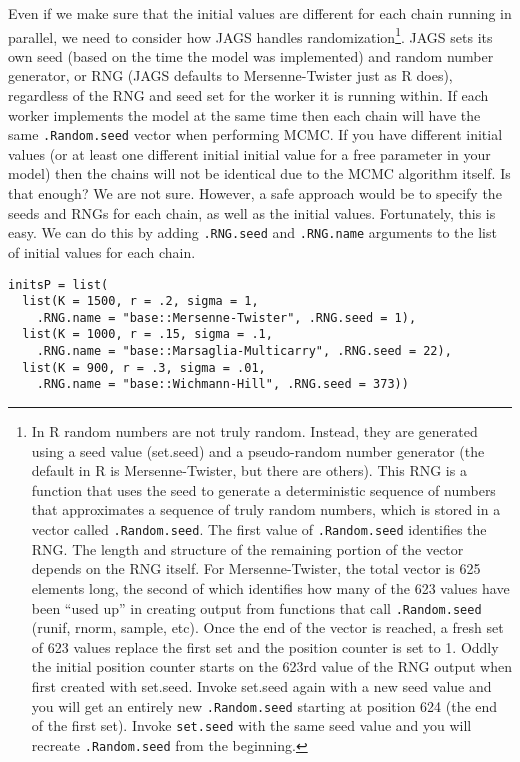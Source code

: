 \documentclass[12pt,english]{article}
\newcommand{\q}[1]{``#1''} %
\begin{document}
\noindent Even if we make sure that the initial values are different for each chain running in parallel, we need to consider how JAGS handles randomization\footnote{In R random numbers are not truly random. Instead, they are generated using a seed value (set.seed) and a pseudo-random number generator (the default in R is Mersenne-Twister, but there are others). This RNG is a function that uses the seed to generate a deterministic sequence of numbers that approximates a sequence of truly random numbers, which is stored in a vector called \texttt{.Random.seed}. The first value of \texttt{.Random.seed} identifies the RNG. The length and structure of the remaining portion of the vector depends on the RNG itself. For Mersenne-Twister, the total vector is 625 elements long, the second of which identifies how many of the 623 values have been \q{used up} in creating output from functions that call \texttt{.Random.seed} (runif, rnorm, sample, etc). Once the end of the vector is reached, a fresh set of 623 values replace the first set and the position counter is set to 1. Oddly the initial position counter starts on the 623rd value of the RNG output when first created with set.seed. Invoke set.seed again with a new seed value and you will get an entirely new \texttt{.Random.seed} starting at position 624 (the end of the first set). Invoke \texttt{set.seed} with the same seed value and you will recreate \texttt{.Random.seed} from the beginning.}. JAGS sets its own seed (based on the time the model was implemented) and random number generator, or RNG (JAGS defaults to Mersenne-Twister just as R does), regardless of the RNG and seed set for the worker it is running within. If each worker implements the model at the same time then each chain will have the same \texttt{.Random.seed} vector when performing MCMC. If you have different initial values (or at least one different initial initial value for a free parameter in your model) then the chains will not be identical due to the MCMC algorithm itself. Is that enough? We are not sure. However, a safe approach would be to specify the seeds and RNGs for each chain, as well as the initial values. Fortunately, this is easy. We can do this by adding \texttt{.RNG.seed} and \texttt{.RNG.name} arguments to the list of initial values for each chain.

\begin{Verbatim}
initsP = list(
  list(K = 1500, r = .2, sigma = 1, 
  	.RNG.name = "base::Mersenne-Twister", .RNG.seed = 1),
  list(K = 1000, r = .15, sigma = .1,
  	.RNG.name = "base::Marsaglia-Multicarry", .RNG.seed = 22),
  list(K = 900, r = .3, sigma = .01,
  	.RNG.name = "base::Wichmann-Hill", .RNG.seed = 373))
\end{Verbatim}
\end{document}

